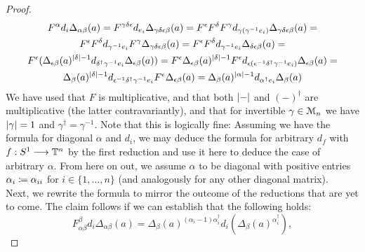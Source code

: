 \begin{prop}
\begin{proof}
\begin{gather}
        \nonumber %
        F^{\alpha} d_i \Delta_{\alpha \beta} (a) = %
        F^{\gamma\delta\epsilon} d_{e_i} %
          \Delta_{\gamma\delta\epsilon\beta} (a) =
        F^{\epsilon} F^{\delta} F^{\gamma} d_{\gamma (\gamma^{-1} e_i)} %
          \Delta_{\gamma\delta\epsilon\beta} (a) = %
          \\
        \nonumber %
        F^{\epsilon} F^{\delta} d_{\gamma^{-1} e_i} F^{\gamma} %
          \Delta_{\gamma\delta\epsilon\beta} (a) = %
        F^{\epsilon} F^{\delta} d_{\gamma^{-1} e_i} %
          \Delta_{\delta\epsilon\beta} (a) = %
          \\%
        \nonumber %
        F^{\epsilon} ( \Delta_{\epsilon\beta} (a)^{\abs{\delta}-1} %
          d_{\delta^\dagger \gamma^{-1} e_i} \Delta_{\epsilon\beta}(a) ) = %
        F^{\epsilon} \Delta_{\epsilon\beta} (a)^{\abs{\delta}-1}%
          F^{\epsilon} d_{\epsilon( \epsilon^{-1} %
          \delta^\dagger \gamma^{-1} e_i )} \Delta_{\epsilon\beta}(a) = %
        \\%
        \Delta_{\beta}(a)^{\abs{\delta}-1} d_{\epsilon^{-1} \delta^\dagger %
          \gamma^{-1} e_i} F^{\epsilon}\Delta_{\epsilon\beta}(a) = %
        \Delta_{\beta}(a)^{\abs{\alpha}-1} d_{\alpha^\dagger e_i} \Delta_{\beta}(a)%
      \end{gather}
      We have used that $F$ is multiplicative, and that both $\left\vert-\right\vert$ and
      $(-)^\dagger$ are multiplicative (the latter contravariantly), and that
      for invertible $\gamma \in \mathcal{M}_n$ we have $\left\vert\gamma\right\vert = 1$ and
      $\gamma^\dagger = \gamma^{-1}$. Note that this is logically fine: Assuming
      we have the formula for diagonal $\alpha$ and $d_i$, we may deduce the
      formula for arbitrary $d_f$ with $f: S^1 \longrightarrow \mathbb{T}^n$ by the first reduction
      and use it here to deduce the case of arbitrary $\alpha$. From here on
      out, we assume $\alpha$ to be diagonal with positive entries $\alpha_{i}
      \coloneqq \alpha_{ii}$ for $i \in \{1,\ldots,n\}$ (and analogously for any
      other diagonal matrix).\\
      Next, we rewrite the formula to mirror the outcome of the reductions that
      are yet to come. The claim follows if we can establish that the following
      holds:
      \begin{equation}\label{eq_Fdw_one_dim_for_diagram}
        F_{\alpha\beta}^\beta d_i \Delta_{\alpha\beta} (a) =%
        \Delta_{\beta}(a)^{(\alpha_i-1)\alpha^\dagger_i} %
          d_i (\Delta_{\beta}(a)^{\alpha^\dagger_i}),
      \end{equation}

\end{proof}
\end{prop}
